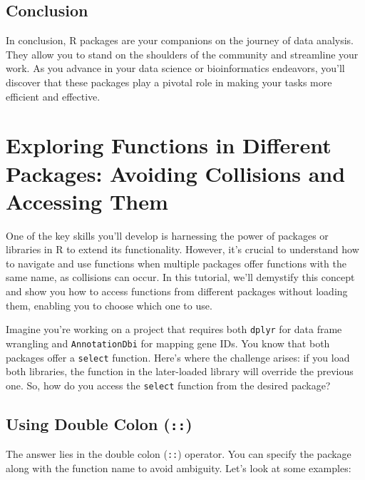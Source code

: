 \documentclass[
]{book}
\begin{document}
\hypertarget{conclusion-11}{%
\subsection{Conclusion}\label{conclusion-11}}

In conclusion, R packages are your companions on the journey of data analysis. They allow you to stand on the shoulders of the community and streamline your work. As you advance in your data science or bioinformatics endeavors, you'll discover that these packages play a pivotal role in making your tasks more efficient and effective.

\hypertarget{exploring-functions-in-different-packages-avoiding-collisions-and-accessing-them}{%
\section{Exploring Functions in Different Packages: Avoiding Collisions and Accessing Them}\label{exploring-functions-in-different-packages-avoiding-collisions-and-accessing-them}}

One of the key skills you'll develop is harnessing the power of packages or libraries in R to extend its functionality. However, it's crucial to understand how to navigate and use functions when multiple packages offer functions with the same name, as collisions can occur. In this tutorial, we'll demystify this concept and show you how to access functions from different packages without loading them, enabling you to choose which one to use.

Imagine you're working on a project that requires both \texttt{dplyr} for data frame wrangling and \texttt{AnnotationDbi} for mapping gene IDs. You know that both packages offer a \texttt{select} function. Here's where the challenge arises: if you load both libraries, the function in the later-loaded library will override the previous one. So, how do you access the \texttt{select} function from the desired package?

\hypertarget{using-double-colon}{%
\subsection{\texorpdfstring{Using Double Colon (\texttt{::})}{Using Double Colon (::)}}\label{using-double-colon}}

The answer lies in the double colon (\texttt{::}) operator. You can specify the package along with the function name to avoid ambiguity. Let's look at some examples:
\end{document}
